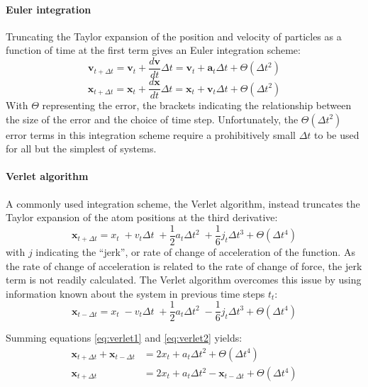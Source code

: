 \paragraph{Euler integration}
Truncating the Taylor expansion of the position and velocity of particles as a function of time at the first term gives an Euler integration scheme:
\begin{equation}
	\mathbf{v}_{t +\Delta t} = \mathbf{v}_t + \frac{d\mathbf{v}}{dt}\Delta t = \mathbf{v}_t + \mathbf{a}_t\Delta t +\Theta(\Delta t^2)
	\end{equation}
\begin{equation}
	\mathbf{x}_{t +\Delta t} = \mathbf{x}_t + \frac{d\mathbf{x}}{dt}\Delta t = \mathbf{x}_t + \mathbf{v}_t\Delta t +\Theta(\Delta t^2)
\end{equation}
With $\Theta$ representing the error, the brackets indicating the relationship between the size of the error and the choice of time step.
Unfortunately, the $\Theta(\Delta t^2)$ error terms in this integration scheme require a prohibitively small $\Delta t$ to be used for all but the simplest of systems. 

\paragraph{Verlet algorithm} A commonly used integration scheme, the Verlet algorithm, instead truncates the Taylor expansion of the atom positions at the third derivative:
\begin{equation}
\mathbf{x}_{t + \Delta t} = x_{t} \; +  v_{t}\Delta t \;+ \frac{1}{2}a_{t}\Delta t^2     \;+ \frac{1}{6}j_{t}\Delta t^3 + \Theta(\Delta t^4)
\label{eq:verlet1}
\end{equation}
with $j$ indicating the ``jerk'', or rate of change of acceleration of the function.
As the rate of change of acceleration is related to the rate of change of force, the jerk term is not readily calculated.
The Verlet algorithm overcomes this issue by using information known about the system in previous time steps $t_{t}$:
\begin{equation}
\mathbf{x}_{t - \Delta t} = x_{t} \; -  v_{t}\Delta t \;+ \frac{1}{2}a_{t}\Delta t^2     \;- \frac{1}{6}j_{t}\Delta t^3 + \Theta(\Delta t^4)
\label{eq:verlet2}
\end{equation}

Summing equations \ref{eq:verlet1} and \ref{eq:verlet2} yields:
\begin{align}
\mathbf{x}_{t + \Delta t} + \mathbf{x}_{t - \Delta t} &= 2x_{t} + a_{t}\Delta t^2 + \Theta(\Delta t^4)\\
\mathbf{x}_{t + \Delta t} &= 2x_{t} + a_{t}\Delta t^2 -  \mathbf{x}_{t - \Delta t} + \Theta(\Delta t^4)
\label{eq:verlet}
\end{align}

